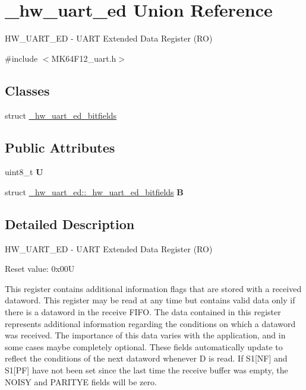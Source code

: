 \hypertarget{union__hw__uart__ed}{}\section{\+\_\+hw\+\_\+uart\+\_\+ed Union Reference}
\label{union__hw__uart__ed}


H\+W\+\_\+\+U\+A\+R\+T\+\_\+\+ED -\/ U\+A\+RT Extended Data Register (RO)  




{\ttfamily \#include $<$M\+K64\+F12\+\_\+uart.\+h$>$}

\subsection*{Classes}
\begin{DoxyCompactItemize}
\item 
struct \hyperlink{struct__hw__uart__ed_1_1__hw__uart__ed__bitfields}{\+\_\+hw\+\_\+uart\+\_\+ed\+\_\+bitfields}
\end{DoxyCompactItemize}
\subsection*{Public Attributes}
\begin{DoxyCompactItemize}
\item 
uint8\+\_\+t {\bfseries U}\hypertarget{union__hw__uart__ed_ab33be8b0ddf66ffc7278e9ec1bc8028e}{}\label{union__hw__uart__ed_ab33be8b0ddf66ffc7278e9ec1bc8028e}

\item 
struct \hyperlink{struct__hw__uart__ed_1_1__hw__uart__ed__bitfields}{\+\_\+hw\+\_\+uart\+\_\+ed\+::\+\_\+hw\+\_\+uart\+\_\+ed\+\_\+bitfields} {\bfseries B}\hypertarget{union__hw__uart__ed_ade7ea720c42daaedeb15ab2c3421d8bc}{}\label{union__hw__uart__ed_ade7ea720c42daaedeb15ab2c3421d8bc}

\end{DoxyCompactItemize}


\subsection{Detailed Description}
H\+W\+\_\+\+U\+A\+R\+T\+\_\+\+ED -\/ U\+A\+RT Extended Data Register (RO) 

Reset value\+: 0x00U

This register contains additional information flags that are stored with a received dataword. This register may be read at any time but contains valid data only if there is a dataword in the receive F\+I\+FO. The data contained in this register represents additional information regarding the conditions on which a dataword was received. The importance of this data varies with the application, and in some cases maybe completely optional. These fields automatically update to reflect the conditions of the next dataword whenever D is read. If S1\mbox{[}NF\mbox{]} and S1\mbox{[}PF\mbox{]} have not been set since the last time the receive buffer was empty, the N\+O\+I\+SY and P\+A\+R\+I\+T\+YE fields will be zero. 

